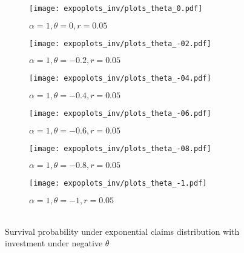 \documentclass[12pt]{article}
\begin{document}
\begin{figure}[!htbp]
\begin{subfigure}{0.5\textwidth}
\texttt{[image: expoplots\_inv/plots\_theta\_0.pdf]} 
\caption{\(\alpha=1, \theta=0, r=0.05\)}
\label{exp_inv_theta0}
\end{subfigure}
\begin{subfigure}{0.5\textwidth}
\texttt{[image: expoplots\_inv/plots\_theta\_-02.pdf]} 
\caption{\(\alpha=1, \theta=-0.2, r=0.05\)}
\label{exp_inv_theta-02}
\end{subfigure}
\begin{subfigure}{0.5\textwidth}
\texttt{[image: expoplots\_inv/plots\_theta\_-04.pdf]} 
\caption{\(\alpha=1, \theta=-0.4, r=0.05\)}
\label{exp_inv_theta-04}
\end{subfigure}
\begin{subfigure}{0.5\textwidth}
\texttt{[image: expoplots\_inv/plots\_theta\_-06.pdf]} 
\caption{\(\alpha=1, \theta=-0.6, r=0.05\)}
\label{exp_inv_theta-06}
\end{subfigure}
\begin{subfigure}{0.5\textwidth}
\texttt{[image: expoplots\_inv/plots\_theta\_-08.pdf]} 
\caption{\(\alpha=1, \theta=-0.8, r=0.05\)}
\label{exp_inv_theta-08}
\end{subfigure}
\begin{subfigure}{0.5\textwidth}
\texttt{[image: expoplots\_inv/plots\_theta\_-1.pdf]} 
\caption{\(\alpha=1, \theta=-1, r=0.05\)}
\label{exp_inv_theta-1}
\end{subfigure}
\caption{\\Survival probability under exponential claims distribution with investment under negative \(\theta\)}
\label{fig:image5}
\end{figure}

\newpage

\end{document}

